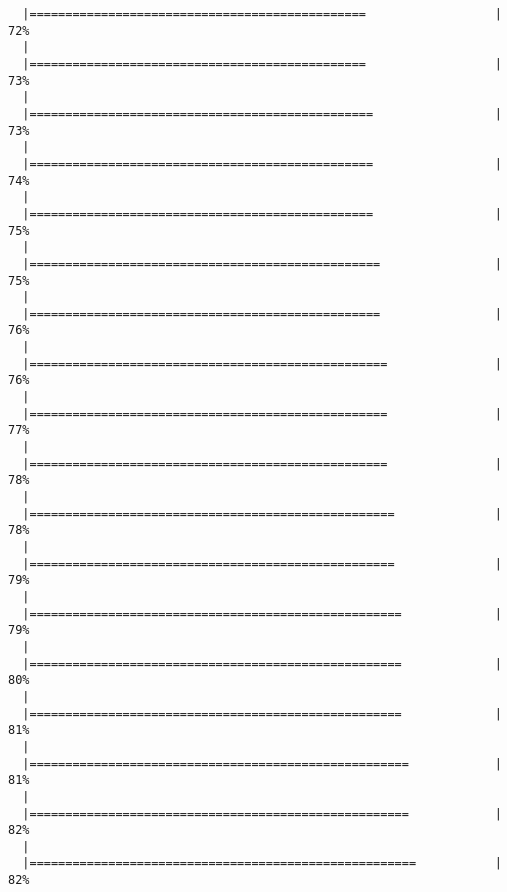 \begin{knitrout}
\begin{kframe}
\begin{verbatim}
  |===============================================                  |  72%
  |                                                                       
  |===============================================                  |  73%
  |                                                                       
  |================================================                 |  73%
  |                                                                       
  |================================================                 |  74%
  |                                                                       
  |================================================                 |  75%
  |                                                                       
  |=================================================                |  75%
  |                                                                       
  |=================================================                |  76%
  |                                                                       
  |==================================================               |  76%
  |                                                                       
  |==================================================               |  77%
  |                                                                       
  |==================================================               |  78%
  |                                                                       
  |===================================================              |  78%
  |                                                                       
  |===================================================              |  79%
  |                                                                       
  |====================================================             |  79%
  |                                                                       
  |====================================================             |  80%
  |                                                                       
  |====================================================             |  81%
  |                                                                       
  |=====================================================            |  81%
  |                                                                       
  |=====================================================            |  82%
  |                                                                       
  |======================================================           |  82%

\end{verbatim}
\end{kframe}
\end{knitrout}
